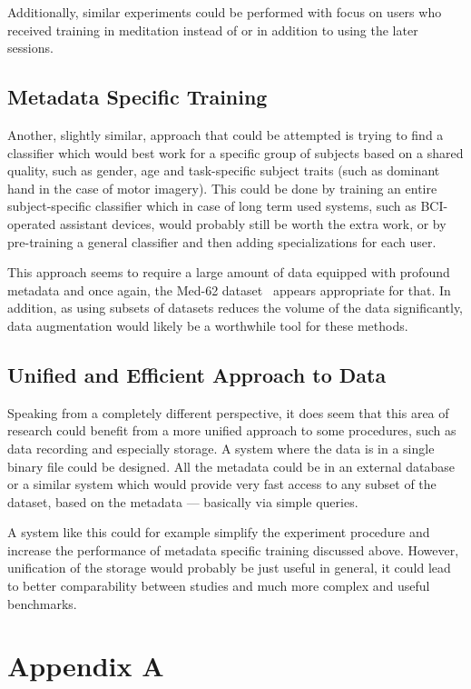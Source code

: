 \documentclass[english, he, bc, kiv, iso690alph]{fasthesis}
\begin{document}
Additionally, similar experiments could be performed with focus on users who received training in meditation instead of or in addition to using the later sessions.

\section{Metadata Specific Training}

Another, slightly similar, approach that could be attempted is trying to find a classifier which would best work for a specific group of subjects based on a shared quality, such as gender, age and task-specific subject traits (such as dominant hand in the case of motor imagery). This could be done by training an entire subject-specific classifier which in case of long term used systems, such as BCI-operated assistant devices, would probably still be worth the extra work, or by pre-training a general classifier and then adding specializations for each user.

This approach seems to require a large amount of data equipped with profound metadata and once again, the Med-62 dataset~\cite{data:stieger:21} appears appropriate for that. In addition, as using subsets of datasets reduces the volume of the data significantly, data augmentation would likely be a worthwhile tool for these methods.

\section{Unified and Efficient Approach to Data}

Speaking from a completely different perspective, it does seem that this area of research could benefit from a more unified approach to some procedures, such as data recording and especially storage. A system where the data is in a single binary file could be designed. All the metadata could be in an external database or a similar system which would provide very fast access to any subset of the dataset, based on the metadata --- basically via simple queries.

A system like this could for example simplify the experiment procedure and increase the performance of metadata specific training discussed above. However, unification of the storage would probably be just useful in general, it could lead to better comparability between studies and much more complex and useful benchmarks.

\appendix
\chapter{Appendix A}

\backmatter
\printbibliography
\backpage
\end{document}

